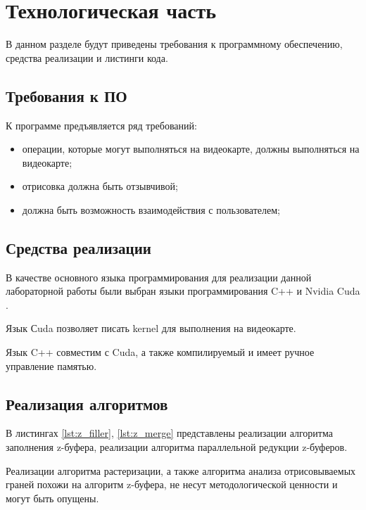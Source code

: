 \chapter{Технологическая часть}

В данном разделе будут приведены требования к программному обеспечению, средства реализации и листинги кода.

\section{Требования к ПО}

К программе предъявляется ряд требований:
\begin{itemize}
	\item операции, которые могут выполняться на видеокарте, должны выполняться на видеокарте;
	\item отрисовка должна быть отзывчивой;
	\item должна быть возможность взаимодействия с пользователем;
\end{itemize}

\section{Средства реализации}

В качестве основного языка программирования для реализации данной лабораторной работы были выбран языки программирования C++ \cite{cpplang} и Nvidia Cuda \cite{cuda_lang}.  

Язык Сuda позволяет писать kernel для выполнения на видеокарте.

Язык C++ совместим с Cuda, а также компилируемый и имеет ручное управление памятью.


\section{Реализация алгоритмов}
В листингах \ref{lst:z_filler}, \ref{lst:z_merge} представлены реализации алгоритма заполнения z-буфера, реализации алгоритма параллельной редукции z-буферов.

Реализации алгоритма растеризации, а также алгоритма анализа отрисовываемых граней похожи на алгоритм z-буфера, не несут методологической ценности и могут быть опущены.

